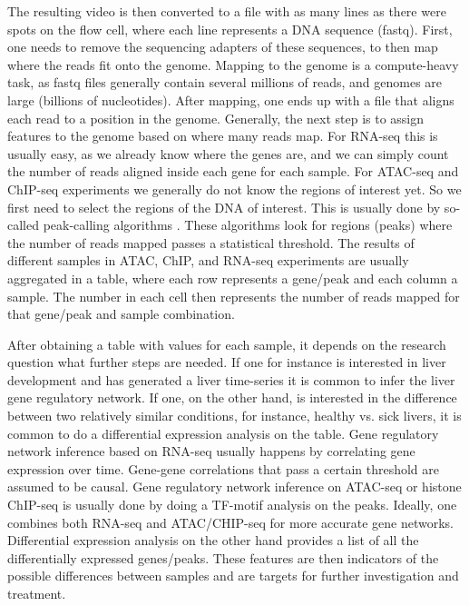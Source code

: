 The resulting video is then converted to a file with as many lines as there were spots on the flow cell, where each line represents a DNA sequence (fastq). First, one needs to remove the sequencing adapters of these sequences, to then map where the reads fit onto the genome. Mapping to the genome is a compute-heavy task, as fastq files generally contain several millions of reads, and genomes are large (billions of nucleotides). After mapping, one ends up with a file that aligns each read to a position in the genome. Generally, the next step is to assign features to the genome based on where many reads map. For RNA-seq this is usually easy, as we already know where the genes are, and we can simply count the number of reads aligned inside each gene for each sample. For ATAC-seq and ChIP-seq experiments we generally do not know the regions of interest yet. So we first need to select the regions of the DNA of interest. This is usually done by so-called peak-calling algorithms \cite{Zhang2008,Stovner2019_epic,Tarbell2019}. These algorithms look for regions (peaks) where the number of reads mapped passes a statistical threshold. The results of different samples in ATAC, ChIP, and RNA-seq experiments are usually aggregated in a table, where each row represents a gene/peak and each column a sample. The number in each cell then represents the number of reads mapped for that gene/peak and sample combination.

After obtaining a table with values for each sample, it depends on the research question what further steps are needed. If one for instance is interested in liver development and has generated a liver time-series it is common to infer the liver gene regulatory network. If one, on the other hand, is interested in the difference between two relatively similar conditions, for instance, healthy vs. sick livers, it is common to do a differential expression analysis on the table. Gene regulatory network inference based on RNA-seq usually happens by correlating gene expression over time. Gene-gene correlations that pass a certain threshold are assumed to be causal. Gene regulatory network inference on ATAC-seq or histone ChIP-seq is usually done by doing a TF-motif analysis on the peaks. Ideally, one combines both RNA-seq and ATAC/CHIP-seq for more accurate gene networks. Differential expression analysis on the other hand provides a list of all the differentially expressed genes/peaks. These features are then indicators of the possible differences between samples and are targets for further investigation and treatment.

